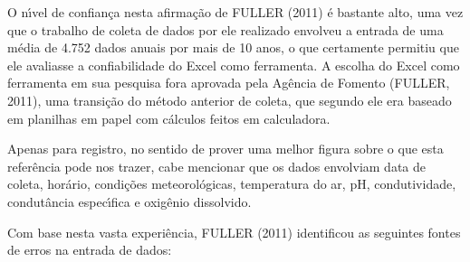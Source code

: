 \documentclass[
12pt,		%
openright,	%
twoside,  %
a4paper,			%
chapter=TITLE,		%
english,			%
french,				%
spanish,			%
brazil				%
]{USPSC-classe/USPSC}
\begin{document}
\noindent\begin{center}\mbox{\centering{}}\end{center}


O n\'{\i}vel de confian\c{c}a nesta afirma\c{c}\~ao de  FULLER (2011) \'e bastante alto, uma vez que o trabalho de coleta de dados por ele realizado envolveu a entrada de uma m\'edia de 4.752 dados anuais por mais de 10 anos, o que certamente permitiu que ele avaliasse a confiabilidade do Excel como ferramenta. A escolha do Excel como ferramenta em sua pesquisa fora aprovada pela Ag\^encia de Fomento  (FULLER, 2011), uma transi\c{c}\~ao do m\'etodo anterior de coleta, que segundo ele era baseado em planilhas em papel com c\'alculos feitos em calculadora.














Apenas para registro, no sentido de prover uma melhor figura sobre o que esta refer\^encia pode nos trazer, cabe mencionar que os dados envolviam data de coleta, hor\'ario, condi\c{c}\~oes meteorol\'ogicas, temperatura do ar, pH, condutividade, condut\^ancia espec\'{\i}fica e oxig\^enio dissolvido.














Com base nesta vasta experi\^encia,  FULLER (2011) identificou as seguintes fontes de erros na entrada de dados:
\end{document}
